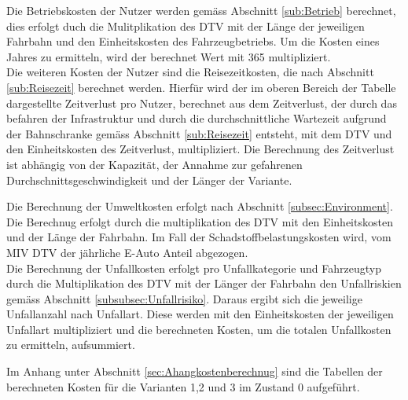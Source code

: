 Die Betriebskosten der Nutzer werden gemäss Abschnitt \ref{sub:Betrieb} berechnet, dies erfolgt duch die Mulitplikation des DTV mit der Länge der jeweiligen Fahrbahn und den Einheitskosten des Fahrzeugbetriebs. Um die Kosten eines Jahres zu ermitteln, wird der berechnet Wert mit 365 multipliziert. \\
Die weiteren Kosten der Nutzer sind die Reisezeitkosten, die nach Abschnitt \ref{sub:Reisezeit} berechnet werden. Hierfür wird der im oberen Bereich der Tabelle dargestellte Zeitverlust pro Nutzer, berechnet aus dem Zeitverlust, der durch das befahren der Infrastruktur und durch die durchschnittliche Wartezeit aufgrund der Bahnschranke gemäss Abschnitt \ref{sub:Reisezeit} entsteht, mit dem DTV und den Einheitskosten des Zeitverlust, multipliziert. Die Berechnung des Zeitverlust ist abhängig von der Kapazität, der Annahme zur gefahrenen Durchschnittsgeschwindigkeit und der Länger der Variante.

Die Berechnung der Umweltkosten erfolgt nach Abschnitt \ref{subsec:Environment}. Die Berechnug erfolgt durch die multiplikation des DTV mit den Einheitskosten und der Länge der Fahrbahn. Im Fall der Schadstoffbelastungskosten wird, vom MIV DTV der jährliche E-Auto Anteil abgezogen. \\
Die Berechnung der Unfallkosten erfolgt pro Unfallkategorie und Fahrzeugtyp durch die Multiplikation des DTV mit der Länger der Fahrbahn den Unfallriskien gemäss Abschnitt \ref{subsubsec:Unfallrisiko}. Daraus ergibt sich die jeweilige Unfallanzahl nach Unfallart. Diese werden mit den Einheitskosten der jeweiligen Unfallart multipliziert und die berechneten Kosten, um die totalen Unfallkosten zu ermitteln, aufsummiert.
 
Im Anhang unter Abschnitt \ref{sec:Ahangkostenberechnug} sind die Tabellen der berechneten Kosten für die Varianten 1,2 und 3 im Zustand 0 aufgeführt.



%

